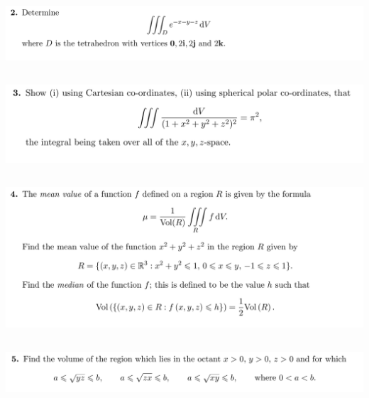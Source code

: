 \subsection{}
\begin{mdframed}
  \includegraphics[width=400pt]{img/oxford-prelims-M5-multivariable-calc-3-2.png}
\end{mdframed}

\subsection{}
\begin{mdframed}
  \includegraphics[width=400pt]{img/oxford-prelims-M5-multivariable-calc-3-3.png}
\end{mdframed}

\subsection{}
\begin{mdframed}
  \includegraphics[width=400pt]{img/oxford-prelims-M5-multivariable-calc-3-4.png}
\end{mdframed}

\subsection{}
\begin{mdframed}
  \includegraphics[width=400pt]{img/oxford-prelims-M5-multivariable-calc-3-5.png}
\end{mdframed}



